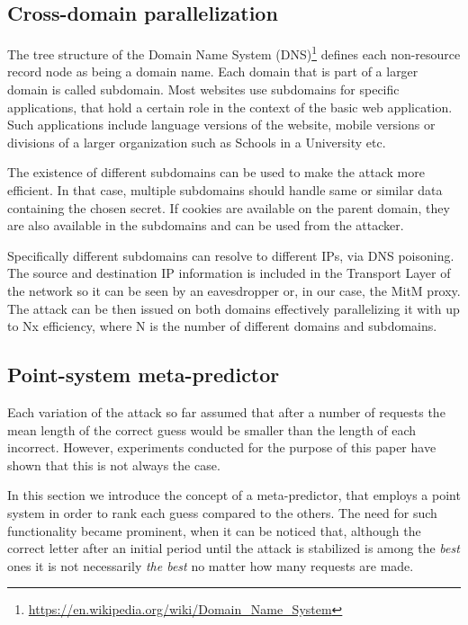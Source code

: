 \subsection{Cross-domain parallelization}

The tree structure of the Domain Name System
(DNS)\footnote{\url{https://en.wikipedia.org/wiki/Domain_Name_System}} defines
each non-resource record node as being a domain name. Each domain that is part
of a larger domain is called subdomain. Most websites use subdomains for
specific applications, that hold a certain role in the context of the basic web
application. Such applications include language versions of the website, mobile
versions or divisions of a larger organization such as Schools in a University
etc.

The existence of different subdomains can be used to make the attack more
efficient. In that case, multiple subdomains should handle same or similar data
containing the chosen secret. If cookies are available on the parent domain,
they are also available in the subdomains and can be used from the attacker.

Specifically different subdomains can resolve to different IPs, via DNS
poisoning. The source and destination IP information is included in the
Transport Layer of the network so it can be seen by an eavesdropper or, in our
case, the MitM proxy. The attack can be then issued on both domains effectively
parallelizing it with up to Nx efficiency, where N is the number of different
domains and subdomains.

\subsection{Point-system meta-predictor}\label{subsec:point_system}

Each variation of the attack so far assumed that after a number of requests
the mean length of the correct guess would be smaller than the length of each
incorrect. However, experiments conducted for the purpose of this paper have
shown that this is not always the case.

In this section we introduce the concept of a meta-predictor, that employs a
point system in order to rank each guess compared to the others. The need for
such functionality became prominent, when it can be noticed that, although the
correct letter after an initial period until the attack is stabilized is among
the \textit{best} ones it is not necessarily \textit{the best} no matter how
many requests are made.

